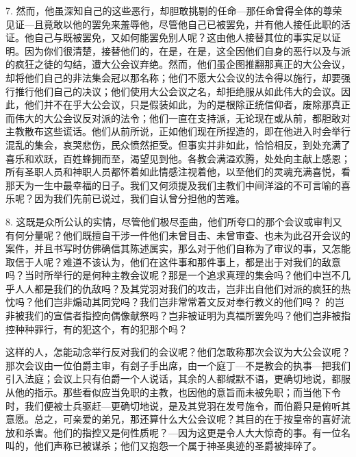 7. 然而，他虽深知自己的这些恶行，却胆敢挑剔的任命---那任命曾得全体的尊荣见证---且竟敢以他的罢免来羞辱他，尽管他自己已被罢免，并有他人接任此职的活证。他自己与既被罢免，又如何能罢免别人呢？这由他人接替其位的事实足以证明。因为你们很清楚，接替他们的，在是，在是，这全因他们自身的恶行以及与派的疯狂之徒的勾结，遭大公会议弃绝。然而，他们虽企图推翻那真正的大公会议，却将他们自己的非法集会冠以那名称；他们不愿大公会议的法令得以施行，却要强行推行他们自己的决议；他们使用大公会议之名，却拒绝服从如此伟大的会议。因此，他们并不在乎大公会议，只是假装如此，为的是根除正统信仰者，废除那真正而伟大的大公会议反对派的法令；他们一直在支持派，无论现在或从前，都胆敢对主教散布这些谎话。他们从前所说，正如他们现在所捏造的，即在他进入时会举行混乱的集会，哀哭悲伤，民众愤然拒受。但事实并非如此，恰恰相反，到处充满了喜乐和欢跃，百姓蜂拥而至，渴望见到他。各教会满溢欢腾，处处向主献上感恩；所有圣职人员和神职人员都怀着如此情感注视着他，以至他们的灵魂充满喜悦，看那天为一生中最幸福的日子。我们又何须提及我们主教们中间洋溢的不可言喻的喜乐呢？因为我们先前已说过，我们自认曾分担他的苦难。\par

8. 这既是众所公认的实情，尽管他们极尽歪曲，他们所夸口的那个会议或审判又有何分量呢？他们既擅自干涉一件他们未曾目击、未曾审查、也未为此召开会议的案件，并且书写时仿佛确信其陈述属实，那么对于他们自称为了审议的事，又怎能取信于人呢？难道不该认为，他们在这件事和那件事上，都是出于对我们的敌意吗？当时所举行的是何种主教会议呢？那是一个追求真理的集会吗？他们中岂不几乎人人都是我们的仇敌吗？及其党羽对我们的攻击，岂非出自他们对派的疯狂的热忱吗？他们岂非煽动其同党吗？我们岂非常常着文反对奉行教义的他们吗？ 的岂非被我们的宣信者指控向偶像献祭吗？岂非被证明为真福所罢免吗？他们岂非被指控种种罪行，有的犯这个，有的犯那个吗？\par

这样的人，怎能动念举行反对我们的会议呢？他们怎敢称那次会议为大公会议呢？那次会议由一位伯爵主审，有刽子手出席，由一个庭丁---不是教会的执事---把我们引入法庭；会议上只有伯爵一个人说话，其余的人都缄默不语，更确切地说，都服从他的指示。那些看似应当免职的主教，也因他的意旨而未被免职；而当他下令时，我们便被士兵驱赶---更确切地说，是及其党羽在发号施令，而伯爵只是俯听其意愿。总之，可亲爱的弟兄，那还算什么大公会议呢？其目的在于按皇帝的喜好流放和杀害。他们的指控又是何性质呢？---因为这更是令人大大惊奇的事。有一位名叫的，他们声称已被谋杀；他们又抱怨一个属于神圣奥迹的圣爵被摔碎了。\par

